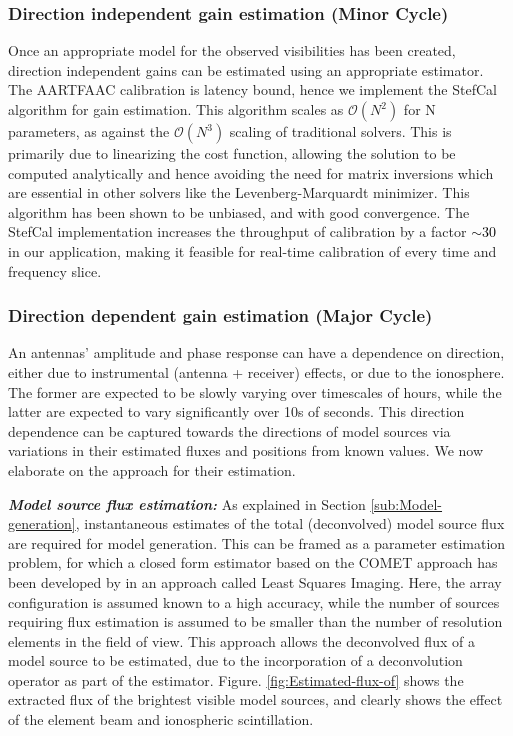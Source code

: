 \documentclass{aa}
\begin{document}
\subsubsection{\label{sub:Direction-independent-gain}Direction independent gain
estimation (Minor Cycle)}

Once an appropriate model for the observed visibilities has been created,
direction independent gains can be estimated using an appropriate
estimator. The AARTFAAC calibration is latency bound, hence we implement
the StefCal\citep{salvini2013stef} algorithm for gain estimation.
This algorithm scales as $\mathcal{O}(N^{2})$ for N parameters, as
against the $\mathcal{O}(N^{3})$ scaling of traditional solvers.
This is primarily due to linearizing the cost function, allowing the
solution to be computed analytically and hence avoiding the need for
matrix inversions which are essential in other solvers like the Levenberg-Marquardt
minimizer. This algorithm has been shown to be unbiased, and with
good convergence. The StefCal implementation increases the throughput
of calibration by a factor\textcolor{black}{{} $\sim$30}\textcolor{red}{{}
}in our application, making it feasible for real-time calibration
of every time and frequency slice.


\subsubsection{\label{sub:Direction-dependent-gain}Direction dependent gain estimation
(Major Cycle)}

An antennas' amplitude and phase response can have a dependence on
direction, either due to instrumental (antenna + receiver) effects,
or due to the ionosphere. The former are expected to be slowly varying
over timescales of hours, while the latter are expected to vary significantly
over 10s of seconds. This direction dependence can be captured towards
the directions of model sources via variations in their estimated
fluxes and positions from known values. We now elaborate on the approach
for their estimation.



\textbf{\emph{Model source flux estimation:}} As explained in Section
\ref{sub:Model-generation}, instantaneous estimates of the total
(deconvolved) model source flux are required for model generation.
This can be framed as a parameter estimation problem, for which a
closed form estimator based on the COMET approach has been developed
by \citep{wijnholds2008fundamental} in an approach called Least Squares
Imaging. Here, the array configuration is assumed known to a high
accuracy, while the number of sources requiring flux estimation is
assumed to be smaller than the number of resolution elements in the
field of view. This approach allows the deconvolved flux of a model
source to be estimated, due to the incorporation of a deconvolution
operator as part of the estimator. Figure. \ref{fig:Estimated-flux-of}
shows the extracted flux of the brightest visible model sources, and
clearly shows the effect of the element beam and ionospheric scintillation.
\end{document}
